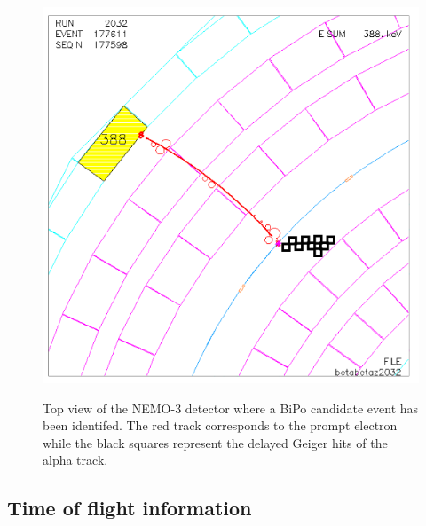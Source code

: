 \documentclass[main.tex]{subfiles}
\begin{document}
\begin{figure}[h!]
\centering
\includegraphics[scale=0.26]{pictures/Chap6/alphaIdentification.png}
\label{AlphaNEMO3}
\caption{Top view of the NEMO-3 detector where a BiPo candidate event has been identifed. The red track corresponds to the prompt electron while the black squares represent the delayed Geiger hits of the alpha track.}
\end{figure}


\FloatBarrier

\subsection{Time of flight information}\label{sec:TOFanalysis}
\end{document}
